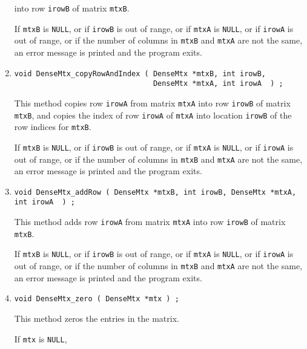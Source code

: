 \begin{enumerate}
into row {\tt irowB} of matrix {\tt mtxB}.
\par {}
If {\tt mtxB} is {\tt NULL},
or if {\tt irowB} is out of range,
or if {\tt mtxA} is {\tt NULL},
or if {\tt irowA} is out of range,
or if the number of columns in {\tt mtxB} and {\tt mtxA} are not
the same,
an error message is printed and the program exits.
\item
\begin{verbatim}
void DenseMtx_copyRowAndIndex ( DenseMtx *mtxB, int irowB, 
                                DenseMtx *mtxA, int irowA  ) ;
\end{verbatim}
This method copies row {\tt irowA} from matrix {\tt mtxA}
into row {\tt irowB} of matrix {\tt mtxB}, and copies the index of row 
{\tt irowA} of {\tt mtxA} into location {\tt irowB} of the row indices 
for {\tt mtxB}.
\par {}
If {\tt mtxB} is {\tt NULL},
or if {\tt irowB} is out of range,
or if {\tt mtxA} is {\tt NULL},
or if {\tt irowA} is out of range,
or if the number of columns in {\tt mtxB} and {\tt mtxA} are not
the same,
an error message is printed and the program exits.
\item
\begin{verbatim}
void DenseMtx_addRow ( DenseMtx *mtxB, int irowB, DenseMtx *mtxA, int irowA  ) ;
\end{verbatim}
This method adds row {\tt irowA} from matrix {\tt mtxA}
into row {\tt irowB} of matrix {\tt mtxB}.
\par {}
If {\tt mtxB} is {\tt NULL},
or if {\tt irowB} is out of range,
or if {\tt mtxA} is {\tt NULL},
or if {\tt irowA} is out of range,
or if the number of columns in {\tt mtxB} and {\tt mtxA} are not
the same,
an error message is printed and the program exits.
\item
\begin{verbatim}
void DenseMtx_zero ( DenseMtx *mtx ) ;
\end{verbatim}
This method zeros the entries in the matrix.
\par {}
If {\tt mtx} is {\tt NULL},

\end{enumerate}
